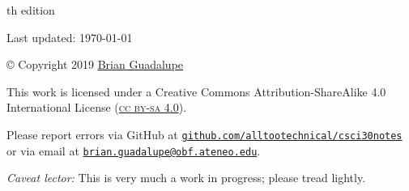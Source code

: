 \thispagestyle{empty}
\vspace*{\fill}
\begin{center}
\begin{minipage}{0.5\textwidth}
\begin{center}
\small
\textonehalf th edition

Last updated: \today
\vspace{1cm}

\copyright{} Copyright 2019 \href{http://penoy.admu.edu.ph/~guadalupe154884/}{Brian Guadalupe}

\vspace{0.5cm}
\ccbysa

This work is licensed under a Creative Commons Attribution-ShareAlike 4.0 International License (\href{http://creativecommons.org/licenses/by-sa/4.0/}{\textsc{cc by-sa 4.0}}).

\vspace{1cm}
Please report errors via GitHub at \href{https://github.com/alltootechnical/csci30notes/issues}{\texttt{github.com/alltootechnical/csci30notes}} or via email at \href{mailto:brian.guadalupe+csci30notes@obf.ateneo.edu}{\texttt{brian.guadalupe@obf.ateneo.edu}}.

\vspace{0.5cm}
\textit{Caveat lector:} This is very much a work in progress; please tread lightly.

\end{center}
\end{minipage}
\end{center}